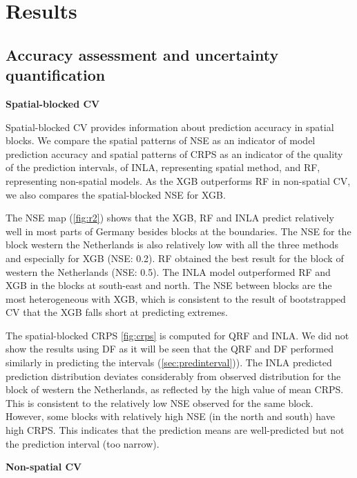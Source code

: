 \documentclass{article}
\begin{document}


\section{Results}
\subsection{Accuracy assessment and uncertainty quantification}

\noindent \textbf{Spatial-blocked CV}

Spatial-blocked CV provides information about prediction accuracy in spatial blocks. 
We compare the spatial patterns of NSE as an indicator of model prediction accuracy and spatial patterns of CRPS as an indicator of the quality of the prediction intervals, of INLA, representing spatial method, and RF, representing non-spatial models. As the XGB outperforms RF in non-spatial CV, we also compares the spatial-blocked NSE for XGB. 

The NSE map (\cref{fig:r2}) shows that the XGB, RF and INLA predict relatively well in most parts of Germany besides blocks at the boundaries. The NSE for the block western the Netherlands is also relatively low with all the three methods and especially for XGB (NSE: 0.2). RF obtained the best result for the block of western the Netherlands (NSE: 0.5). The INLA model outperformed RF and XGB in the blocks at south-east and north. The NSE between blocks are the most heterogeneous with XGB, which is consistent to the result of bootstrapped CV that the XGB falls short at predicting extremes.  

The spatial-blocked CRPS \cref{fig:crps} is computed for QRF and INLA. We did not show the results using DF as it will be seen that the QRF and DF performed similarly in predicting the intervals (\cref{sec:predinterval})). The INLA predicted prediction distribution deviates considerably from observed distribution for the block of western the Netherlands, as reflected by the high value of mean CRPS. This is consistent to the relatively low NSE observed for the same block. However, some blocks with relatively high NSE (in the north and south) have high CRPS. This indicates that the prediction means are well-predicted but not the prediction interval (too narrow). 

\textbf{Non-spatial CV}
\end{document}
